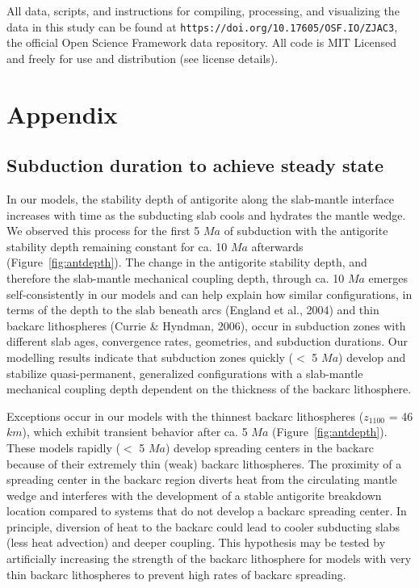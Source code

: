 \documentclass[draft,linenumbers]{agujournal2018}
\begin{document}
All data, scripts, and instructions for compiling, processing, and
visualizing the data in this study can be found at
\texttt{https://doi.org/10.17605/OSF.IO/ZJAC3}, the official Open
Science Framework data repository. All code is MIT Licensed and freely
for use and distribution (see license details).

\clearpage

\appendix
\section{Appendix}

\subsection{Subduction duration to achieve steady state}

In our models, the stability depth of antigorite along the slab-mantle
interface increases with time as the subducting slab cools and hydrates
the mantle wedge. We observed this process for the first 5 \(Ma\) of
subduction with the antigorite stability depth remaining constant for
ca. 10 \(Ma\) afterwards (Figure~\ref{fig:antdepth}). The change in the
antigorite stability depth, and therefore the slab-mantle mechanical
coupling depth, through ca. 10 \(Ma\) emerges self-consistently in our
models and can help explain how similar configurations, in terms of the
depth to the slab beneath arcs (England et al., 2004) and thin backarc
lithospheres (Currie \& Hyndman, 2006), occur in subduction zones with
different slab ages, convergence rates, geometries, and subduction
durations. Our modelling results indicate that subduction zones quickly
(\(<\) 5 \(Ma\)) develop and stabilize quasi-permanent, generalized
configurations with a slab-mantle mechanical coupling depth dependent on
the thickness of the backarc lithosphere.

Exceptions occur in our models with the thinnest backarc lithospheres
(\(z_{1100}\) = 46 \(km\)), which exhibit transient behavior after ca. 5
\(Ma\) (Figure~\ref{fig:antdepth}). These models rapidly (\(<\) 5
\(Ma\)) develop spreading centers in the backarc because of their
extremely thin (weak) backarc lithospheres. The proximity of a spreading
center in the backarc region diverts heat from the circulating mantle
wedge and interferes with the development of a stable antigorite
breakdown location compared to systems that do not develop a backarc
spreading center. In principle, diversion of heat to the backarc could
lead to cooler subducting slabs (less heat advection) and deeper
coupling. This hypothesis may be tested by artificially increasing the
strength of the backarc lithosphere for models with very thin backarc
lithospheres to prevent high rates of backarc spreading.
\end{document}
